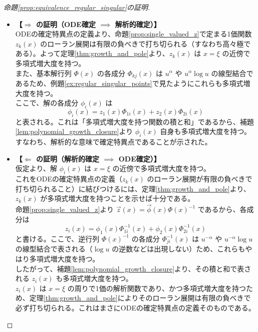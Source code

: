 \begin{proof}[命題\ref{prop:equivalence_regular_singular}の証明]
\begin{itemize}
    \item \textbf{【$\Rightarrow$ の証明（ODE確定 $\implies$ 解析的確定）】}\\
    ODEの確定特異点の定義より、命題\ref{prop:single_valued_z}で定まる1価関数 $z_{k}(x)$ のローラン展開は有限の負べきで打ち切られる（すなわち高々極である）。よって定理\ref{thm:growth_and_pole}より、$z_k(x)$ は $x=\xi$ の近傍で多項式増大度を持つ。\\
    また、基本解行列 $\Phi(x)$ の各成分 $\Phi_{kj}(x)$ は $u^{\alpha}$ や $u^{\alpha}\log u$ の線型結合であるため、例題\ref{ex:regular_singular_points}で見たようにこれらも多項式増大度を持つ。\\
    ここで、解の各成分 $\phi_i(x)$ は
    \[
    \phi_{i}(x) = z_{1}(x)\Phi_{1i}(x) + z_{2}(x)\Phi_{2i}(x)
    \]
    と表される。これは「多項式増大度を持つ関数の積と和」であるから、補題\ref{lem:polynomial_growth_closure}より $\phi_i(x)$ 自身も多項式増大度を持つ。すなわち、解析的な意味で確定特異点であることが示された。

    \item \textbf{【$\Leftarrow$ の証明（解析的確定 $\implies$ ODE確定）】}\\
    仮定より、解 $\phi_i(x)$ は $x=\xi$ の近傍で多項式増大度を持つ。\\
    これをODEの確定特異点の定義（$z_k(x)$ のローラン展開が有限の負べきで打ち切られること）に結びつけるには、定理\ref{thm:growth_and_pole}より、$z_k(x)$ が多項式増大度を持つことを示せば十分である。\\
    命題\ref{prop:single_valued_z}より $\vec{z}(x) = \vec{\phi}(x)\Phi(x)^{-1}$ であるから、各成分は
    \[
    z_{i}(x) = \phi_{1}(x)\Phi_{1i}^{-1}(x) + \phi_{2}(x)\Phi_{2i}^{-1}(x)
    \]
    と書ける。ここで、逆行列 $\Phi(x)^{-1}$ の各成分 $\Phi_{ji}^{-1}(x)$ は $u^{-\alpha}$ や $u^{-\alpha}\log u$ の線型結合で表される（$\log u$ の逆数などは出現しない）ため、これらもやはり多項式増大度を持つ。\\
    したがって、補題\ref{lem:polynomial_growth_closure}より、その積と和で表される $z_i(x)$ も多項式増大度を持つ。\\
    $z_i(x)$ は $x=\xi$ の周りで1価の解析関数であり、かつ多項式増大度を持つため、定理\ref{thm:growth_and_pole}によりそのローラン展開は有限の負べきで必ず打ち切られる。これはまさにODEの確定特異点の定義そのものである。
\end{itemize}
\end{proof}


